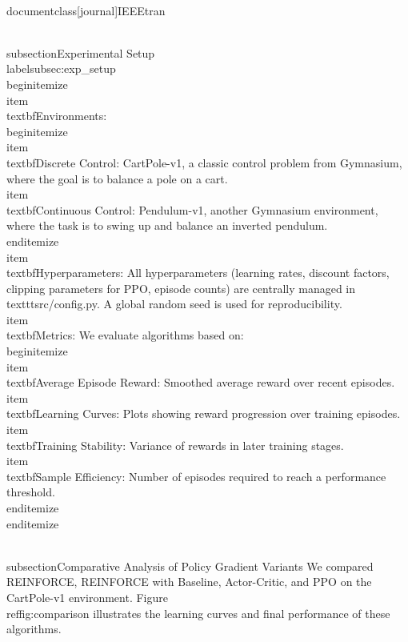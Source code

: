 \\documentclass[journal]{IEEEtran}
\begin{document}
\\subsection{Experimental Setup}
\\label{subsec:exp_setup}
\\begin{itemize}
    \\item \\textbf{Environments}:
    \\begin{itemize}
        \\item \\textbf{Discrete Control}: CartPole-v1, a classic control problem from Gymnasium, where the goal is to balance a pole on a cart.
        \\item \\textbf{Continuous Control}: Pendulum-v1, another Gymnasium environment, where the task is to swing up and balance an inverted pendulum.
    \\end{itemize}
    \\item \\textbf{Hyperparameters}: All hyperparameters (learning rates, discount factors, clipping parameters for PPO, episode counts) are centrally managed in \\texttt{src/config.py}. A global random seed is used for reproducibility.
    \\item \\textbf{Metrics}: We evaluate algorithms based on:
    \\begin{itemize}
        \\item \\textbf{Average Episode Reward}: Smoothed average reward over recent episodes.
        \\item \\textbf{Learning Curves}: Plots showing reward progression over training episodes.
        \\item \\textbf{Training Stability}: Variance of rewards in later training stages.
        \\item \\textbf{Sample Efficiency}: Number of episodes required to reach a performance threshold.
    \\end{itemize}
\\end{itemize}

\\subsection{Comparative Analysis of Policy Gradient Variants}
We compared REINFORCE, REINFORCE with Baseline, Actor-Critic, and PPO on the CartPole-v1 environment. Figure \\ref{fig:comparison} illustrates the learning curves and final performance of these algorithms.
\end{document}
